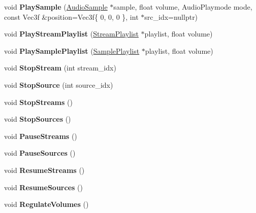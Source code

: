 \begin{DoxyCompactItemize}
\item 
\mbox{\label{class_blade_1_1_audio_manager_a38aa61aff48af21489ef9096f4888d30}} 
void {\bfseries Play\+Sample} (\hyperlink{class_blade_1_1_audio_sample}{Audio\+Sample} $\ast$sample, float volume, Audio\+Playmode mode, const Vec3f \&position=Vec3f\{ 0, 0, 0 \}, int $\ast$src\+\_\+idx=nullptr)
\item 
\mbox{\label{class_blade_1_1_audio_manager_a38dd034452d867957586cc47686bcb9a}} 
void {\bfseries Play\+Stream\+Playlist} (\hyperlink{struct_blade_1_1_stream_playlist}{Stream\+Playlist} $\ast$playlist, float volume)
\item 
\mbox{\label{class_blade_1_1_audio_manager_a166ea37858554e2cc6b97b4aaea9797b}} 
void {\bfseries Play\+Sample\+Playlist} (\hyperlink{struct_blade_1_1_sample_playlist}{Sample\+Playlist} $\ast$playlist, float volume)
\item 
\mbox{\label{class_blade_1_1_audio_manager_a79acd2f6a2933ce8ed2eea139b388b93}} 
void {\bfseries Stop\+Stream} (int stream\+\_\+idx)
\item 
\mbox{\label{class_blade_1_1_audio_manager_abe8fbb12bfb5dff14e4cd000fd55b266}} 
void {\bfseries Stop\+Source} (int source\+\_\+idx)
\item 
\mbox{\label{class_blade_1_1_audio_manager_aef2463b40b6c97a3d4f2b9a72fc13f48}} 
void {\bfseries Stop\+Streams} ()
\item 
\mbox{\label{class_blade_1_1_audio_manager_a2112e72e111040c5f8c32b6d615d63bc}} 
void {\bfseries Stop\+Sources} ()
\item 
\mbox{\label{class_blade_1_1_audio_manager_ae554f09a7f929114d7ce150b7b84af79}} 
void {\bfseries Pause\+Streams} ()
\item 
\mbox{\label{class_blade_1_1_audio_manager_aa09b17fa1814554e1f85e23c17049a4a}} 
void {\bfseries Pause\+Sources} ()
\item 
\mbox{\label{class_blade_1_1_audio_manager_ac3ed228e08f3cafa52ab206fc42ba745}} 
void {\bfseries Resume\+Streams} ()
\item 
\mbox{\label{class_blade_1_1_audio_manager_ab354d7e20969467d0d42bf1050d850be}} 
void {\bfseries Resume\+Sources} ()
\item 
\mbox{\label{class_blade_1_1_audio_manager_ade6ee47743387983ad56e1c77fc6c1a3}} 
void {\bfseries Regulate\+Volumes} ()
\end{DoxyCompactItemize}
